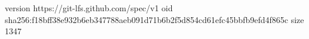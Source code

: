 version https://git-lfs.github.com/spec/v1
oid sha256:f18bff38e932b6eb347788aeb091d71b6b2f5d854cd61efc45bbfb9efd4f865c
size 1347
